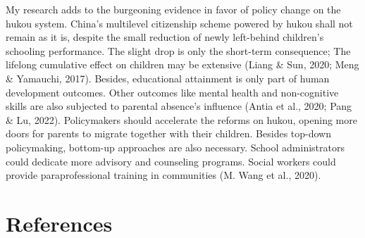 \documentclass[
  man,floatsintext]{apa7}
\begin{document}
My research adds to the burgeoning evidence in favor of policy change on the hukou system. China's multilevel citizenship scheme powered by hukou shall not remain as it is, despite the small reduction of newly left-behind children's schooling performance. The slight drop is only the short-term consequence; The lifelong cumulative effect on children may be extensive (Liang \& Sun, 2020; Meng \& Yamauchi, 2017). Besides, educational attainment is only part of human development outcomes. Other outcomes like mental health and non-cognitive skills are also subjected to parental absence's influence (Antia et al., 2020; Pang \& Lu, 2022). Policymakers should accelerate the reforms on hukou, opening more doors for parents to migrate together with their children. Besides top-down policymaking, bottom-up approaches are also necessary. School administrators could dedicate more advisory and counseling programs. Social workers could provide paraprofessional training in communities (M. Wang et al., 2020).

\newpage

\hypertarget{references}{%
\section{References}\label{references}}
\end{document}
